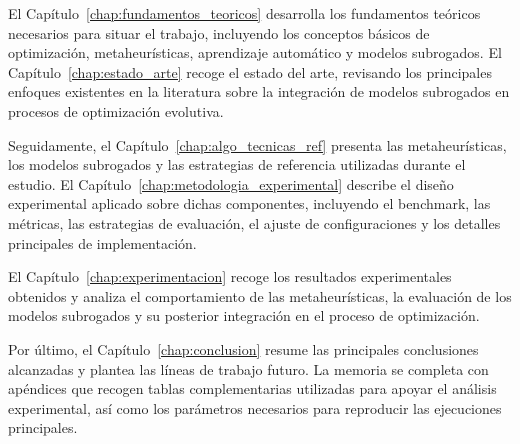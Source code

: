 El Capítulo~\ref{chap:fundamentos_teoricos} desarrolla los fundamentos
teóricos necesarios para situar el trabajo, incluyendo los conceptos básicos de
optimización, metaheurísticas, aprendizaje automático y modelos subrogados. El
Capítulo~\ref{chap:estado_arte} recoge el estado del arte, revisando los principales enfoques existentes en la literatura sobre la integración de modelos subrogados en procesos de optimización evolutiva.

Seguidamente, el Capítulo~\ref{chap:algo_tecnicas_ref} presenta las
metaheurísticas, los modelos subrogados y las estrategias de referencia
utilizadas durante el estudio. El
Capítulo~\ref{chap:metodologia_experimental} describe el diseño experimental
aplicado sobre dichas componentes, incluyendo el benchmark, las métricas, las
estrategias de evaluación, el ajuste de configuraciones y los detalles
principales de implementación.

El Capítulo~\ref{chap:experimentacion} recoge los resultados experimentales
obtenidos y analiza el comportamiento de las metaheurísticas, la evaluación de
los modelos subrogados y su posterior integración en el proceso de
optimización.

Por último, el Capítulo~\ref{chap:conclusion} resume las principales
conclusiones alcanzadas y plantea las líneas de trabajo futuro. La memoria se
completa con apéndices que recogen tablas complementarias utilizadas para
apoyar el análisis experimental, así como los parámetros necesarios para
reproducir las ejecuciones principales.

